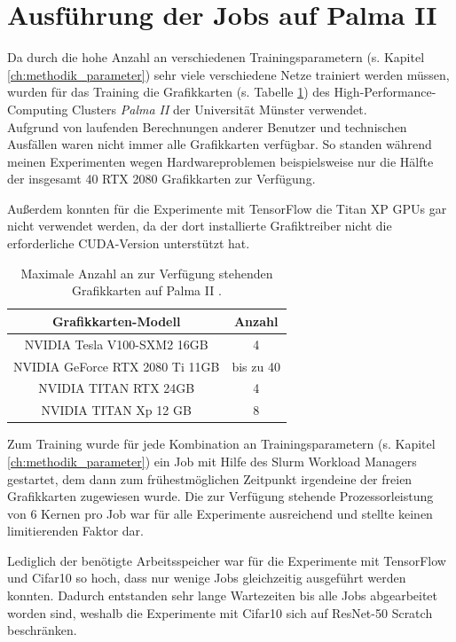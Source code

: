 \section{Ausführung der Jobs auf Palma II}
\label{ch:methodik_palma}
Da durch die hohe Anzahl an verschiedenen Trainingsparametern (s. Kapitel \ref{ch:methodik_parameter}) sehr viele verschiedene Netze trainiert werden müssen, wurden für das Training die Grafikkarten (s. Tabelle \ref{tab:palmaGPUs}) des High-Performance-Computing Clusters \textit{Palma II} der Universität Münster \cite{palma2} verwendet.\\
Aufgrund von laufenden Berechnungen anderer Benutzer und technischen Ausfällen waren nicht immer alle Grafikkarten verfügbar. So standen während meinen Experimenten wegen Hardwareproblemen beispielsweise nur die Hälfte der insgesamt 40 RTX 2080 Grafikkarten zur Verfügung.

Außerdem konnten für die Experimente mit TensorFlow \cite{tensorflow} die Titan XP GPUs gar nicht verwendet werden, da der dort installierte Grafiktreiber nicht die erforderliche CUDA-Version unterstützt hat.

\begin{table}[H]
\centering
\begin{adjustbox}{scale=.9, center}
\begin{tabular}{|c|c|}
\hline 
Grafikkarten-Modell & Anzahl \\ 
\hline 
NVIDIA Tesla V100-SXM2 16GB & 4 \\ 
\hline 
NVIDIA GeForce RTX 2080 Ti 11GB & bis zu 40\\
\hline
NVIDIA TITAN RTX 24GB & 4\\
\hline
NVIDIA TITAN Xp 12 GB & 8\\
\hline
\end{tabular} 
\end{adjustbox}
\caption{Maximale Anzahl an zur Verfügung stehenden Grafikkarten auf Palma II \cite{palma2}.}
\label{tab:palmaGPUs}
\end{table}


Zum Training wurde für jede Kombination an Trainingsparametern (s. Kapitel \ref{ch:methodik_parameter}) ein Job mit Hilfe des Slurm Workload Managers \cite{slurm} gestartet, dem dann zum frühestmöglichen Zeitpunkt irgendeine der freien Grafikkarten zugewiesen wurde. Die zur Verfügung stehende Prozessorleistung von 6 Kernen pro Job war für alle Experimente ausreichend und stellte keinen limitierenden Faktor dar.

Lediglich der benötigte Arbeitsspeicher war für die Experimente mit TensorFlow \cite{tensorflow} und Cifar10 \cite{cifar10} so hoch, dass nur wenige Jobs gleichzeitig ausgeführt werden konnten. Dadurch entstanden sehr lange Wartezeiten bis alle Jobs abgearbeitet worden sind, weshalb die Experimente mit Cifar10 \cite{cifar10} sich auf ResNet-50 Scratch beschränken.

